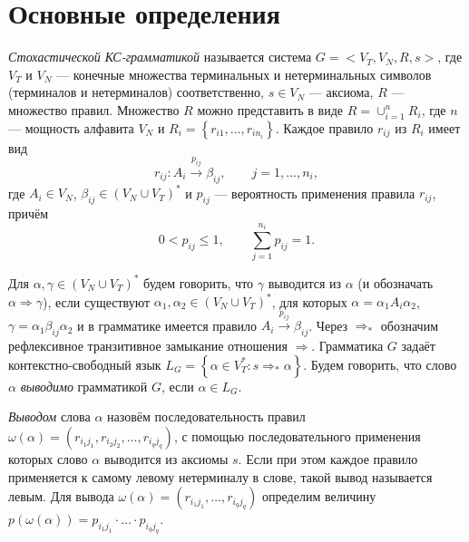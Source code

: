 \documentclass[12pt]{article}
\begin{document}
\section{Основные определения}

\textit{Стохастической КС-грамматикой} \cite{fu-struct} называется система $G = <V_T, V_N, R, s>$, где $V_T$ и $V_N$ --- конечные множества терминальных и нетерминальных символов (терминалов и нетерминалов) соответственно, $s \in V_N$ --- аксиома, $R$ --- множество правил. Множество $R$ можно представить в виде $R = \cup_{i = 1}^n R_i$, где $n$ --- мощность алфавита $V_N$ и $R_i = \left\{r_{i1}, \ldots, r_{i n_i}\right\}$. Каждое правило $r_{ij}$ из $R_i$ имеет вид
\begin{equation}
	r_{ij} : A_i \xrightarrow{p_{ij}} \beta_{ij},\qquad j = 1, \ldots, n_i,
\end{equation}
где $A_i \in V_N$, $\beta_{ij} \in (V_N \cup V_T)^*$ и $p_{ij}$ --- вероятность применения правила $r_{ij}$, причём
\begin{equation}
\label{eq:p_values}
	0 < p_{ij} \leq 1,\qquad \sum_{j = 1}^{n_i} p_{ij} = 1.
\end{equation}

Для $\alpha, \gamma \in (V_N \cup V_T)^*$ будем говорить, что $\gamma$ выводится из $\alpha$ (и обозначать $\alpha \Rightarrow \gamma$), если существуют $\alpha_1, \alpha_2 \in (V_N \cup V_T)^*$, для которых $\alpha = \alpha_1 A_i \alpha_2$, $\gamma = \alpha_1 \beta_{ij} \alpha_2$ и в грамматике имеется правило $A_i \xrightarrow{p_{ij}} \beta_{ij}$. Через $\Rightarrow_*$ обозначим рефлексивное транзитивное замыкание отношения $\Rightarrow$. Грамматика $G$ задаёт контекстно-свободный язык $L_G = \left\{ \alpha \in V_T^* : s \Rightarrow_* \alpha\right\}$. Будем говорить, что слово $\alpha$ \textit{выводимо} грамматикой $G$, если $\alpha \in L_G$.

\textit{Выводом} слова $\alpha$ назовём последовательность правил $\omega(\alpha) = (r_{i_1 j_1}, r_{i_2 j_2}, \ldots, r_{i_q j_q})$, с помощью последовательного применения которых слово $\alpha$ выводится из аксиомы $s$. Если при этом каждое правило применяется к самому левому нетерминалу в слове, такой вывод называется левым. Для вывода $\omega(\alpha) = (r_{i_1 j_1}, \ldots, r_{i_q j_q})$ определим величину $p(\omega(\alpha)) = p_{i_1 j_1} \cdot \ldots \cdot p_{i_q j_q}$.
\end{document}
